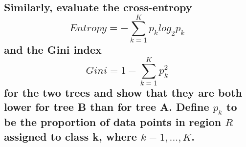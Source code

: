 \documentclass{article}
\begin{document}
	\subsection{Similarly, evaluate the cross-entropy 
		\[ Entropy = - \sum_{k = 1}^{K}p_{k}log_{2}p_{k}\]
		and the Gini index
		\[ Gini = 1 - \sum_{k = 1}^{K}p^{2}_{k}\]
		for the two trees and show that they are both lower for tree B than for tree A. Define $p_{k}$
		to be the proportion of data points in region $R$ assigned to class k, where $k = 1,...,K$.
		}
\end{document}
